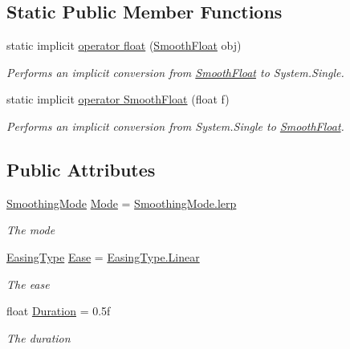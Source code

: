 \subsection*{Static Public Member Functions}
\begin{DoxyCompactItemize}
\item 
static implicit \hyperlink{class_radical_library_1_1_smooth_float_a468aab25d1723a1022bf25a9c55796f7}{operator float} (\hyperlink{class_radical_library_1_1_smooth_float}{Smooth\+Float} obj)
\begin{DoxyCompactList}\small\item\em Performs an implicit conversion from \hyperlink{class_radical_library_1_1_smooth_float}{Smooth\+Float} to System.\+Single. \end{DoxyCompactList}\item 
static implicit \hyperlink{class_radical_library_1_1_smooth_float_a214d38b22fe1158b8a80fb8a3aa147d1}{operator Smooth\+Float} (float f)
\begin{DoxyCompactList}\small\item\em Performs an implicit conversion from System.\+Single to \hyperlink{class_radical_library_1_1_smooth_float}{Smooth\+Float}. \end{DoxyCompactList}\end{DoxyCompactItemize}
\subsection*{Public Attributes}
\begin{DoxyCompactItemize}
\item 
\hyperlink{namespace_radical_library_a53ca8c4ff40f917ad8d03bb2c0dbd548}{Smoothing\+Mode} \hyperlink{class_radical_library_1_1_smooth_float_a65b07f9543c0c2eb486b2220c1d8c200}{Mode} = \hyperlink{namespace_radical_library_a53ca8c4ff40f917ad8d03bb2c0dbd548af276cc520db3c6e67c238feefa5130ab}{Smoothing\+Mode.\+lerp}
\begin{DoxyCompactList}\small\item\em The mode \end{DoxyCompactList}\item 
\hyperlink{namespace_radical_library_a2d6877adaf2ec492cf30c572aa684e6f}{Easing\+Type} \hyperlink{class_radical_library_1_1_smooth_float_a0ca55cc46792c8a3b019495aa6ce2a8f}{Ease} = \hyperlink{namespace_radical_library_a2d6877adaf2ec492cf30c572aa684e6fa32a843da6ea40ab3b17a3421ccdf671b}{Easing\+Type.\+Linear}
\begin{DoxyCompactList}\small\item\em The ease \end{DoxyCompactList}\item 
float \hyperlink{class_radical_library_1_1_smooth_float_aabe3fb912c052ec1ba1897a990f14292}{Duration} = 0.\+5f
\begin{DoxyCompactList}\small\item\em The duration \end{DoxyCompactList}\end{DoxyCompactItemize}
